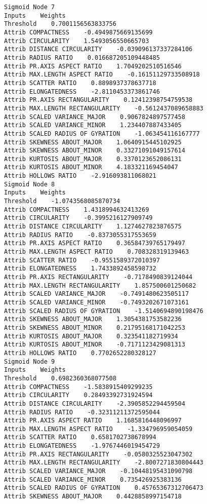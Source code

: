 \documentclass[
	article,			%
	11pt,				%
	oneside,			%
	a4paper,			%
	english,			%
	brazil,				%
	sumario=tradicional
	]{abntex2}
\begin{document}
\begin{lstlisting}
Sigmoid Node 7
Inputs    Weights
Threshold    0.7001156563833756
Attrib COMPACTNESS    -0.4949875669135699
Attrib CIRCULARITY    1.5493056550665703
Attrib DISTANCE CIRCULARITY    -0.039096137337284106
Attrib RADIUS RATIO    0.016687205109448485
Attrib PR.AXIS ASPECT RATIO    1.7049202510516546
Attrib MAX.LENGTH ASPECT RATIO    -0.16151129733508918
Attrib SCATTER RATIO    0.8898937378637718
Attrib ELONGATEDNESS    -2.8110453373861746
Attrib PR.AXIS RECTANGULARITY    0.12412398754759538
Attrib MAX.LENGTH RECTANGULARITY    -0.5612437089658883
Attrib SCALED VARIANCE_MAJOR    0.9067824897577458
Attrib SCALED VARIANCE_MINOR    1.234407887433405
Attrib SCALED RADIUS OF GYRATION    -1.063454116167777
Attrib SKEWNESS ABOUT_MAJOR    1.0640915445102925
Attrib SKEWNESS ABOUT_MINOR    0.33271091049157614
Attrib KURTOSIS ABOUT_MAJOR    0.3370123652086131
Attrib KURTOSIS ABOUT_MINOR    4.183321169454047
Attrib HOLLOWS RATIO    -2.916093811068021
Sigmoid Node 8
Inputs    Weights
Threshold    -1.0743568085870734
Attrib COMPACTNESS    1.4318994632413269
Attrib CIRCULARITY    -0.3995216127909749
Attrib DISTANCE CIRCULARITY    1.1274627823876575
Attrib RADIUS RATIO    -0.8373055317553659
Attrib PR.AXIS ASPECT RATIO    0.36584739765179497
Attrib MAX.LENGTH ASPECT RATIO    0.708328319139463
Attrib SCATTER RATIO    -0.9551589372010397
Attrib ELONGATEDNESS    1.7433892458598732
Attrib PR.AXIS RECTANGULARITY    -0.7178490839124044
Attrib MAX.LENGTH RECTANGULARITY    1.857500601250682
Attrib SCALED VARIANCE_MAJOR    -0.7491480623505117
Attrib SCALED VARIANCE_MINOR    -0.7493202671073161
Attrib SCALED RADIUS OF GYRATION    -1.5140694890198476
Attrib SKEWNESS ABOUT_MAJOR    1.3054381753582236
Attrib SKEWNESS ABOUT_MINOR    0.21795168171042253
Attrib KURTOSIS ABOUT_MAJOR    0.323541182719934
Attrib KURTOSIS ABOUT_MINOR    -0.7171123429081313
Attrib HOLLOWS RATIO    0.7702652280328127
Sigmoid Node 9
Inputs    Weights
Threshold    0.6982360368077508
Attrib COMPACTNESS    -1.5838915409299235
Attrib CIRCULARITY    0.28493392731924594
Attrib DISTANCE CIRCULARITY    -2.3905852294459504
Attrib RADIUS RATIO    -0.32311211372595044
Attrib PR.AXIS ASPECT RATIO    1.1685816448096997
Attrib MAX.LENGTH ASPECT RATIO    -1.334796959054059
Attrib SCATTER RATIO    0.6581702738678994
Attrib ELONGATEDNESS    -1.9767446019454729
Attrib PR.AXIS RECTANGULARITY    -0.0580325523047302
Attrib MAX.LENGTH RECTANGULARITY    -2.8007271830804443
Attrib SCALED VARIANCE_MAJOR    -0.10448195431090798
Attrib SCALED VARIANCE_MINOR    0.735426925383136
Attrib SCALED RADIUS OF GYRATION    0.45765367312706473
Attrib SKEWNESS ABOUT_MAJOR    0.4428858997154718

\end{lstlisting}
\end{document}
